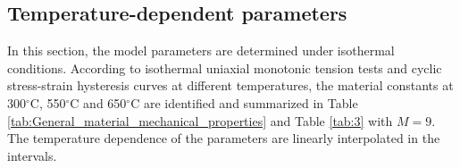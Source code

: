 \documentclass[preprint,5p,twocolumn,11pt,sort&compress]{elsarticle}
\begin{document}
\subsection{Temperature-dependent parameters}
In this section, the model parameters are determined under isothermal conditions.
According to isothermal uniaxial monotonic tension tests and  cyclic stress-strain hysteresis curves at different temperatures, the material constants at 300$^{\circ}$C, 550$^{\circ}$C and 650$^{\circ}$C are identified and summarized in Table \ref{tab:General_material_mechanical_properties} and Table \ref{tab:3} with $M=9$. The temperature dependence of the parameters  are linearly interpolated in the intervals.



\end{document}
